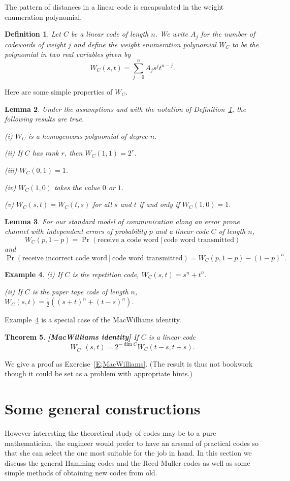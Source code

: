\documentclass[12pt,a4paper]{article}
\theoremstyle{plain}
\newtheorem{theorem}{Theorem}[section]
\newtheorem{lemma}[theorem]{Lemma}
\newtheorem{definition}[theorem]{Definition}
\newtheorem{example}[theorem]{Example}
\theoremstyle{definition}
\begin{document}
The pattern of distances in a linear code
is encapsulated in the
weight enumeration polynomial.
\begin{definition}\label{enumeration}
Let $C$ be a linear code of length $n$.
We write $A_{j}$ for the number of codewords
of weight $j$ and define the
\emph{weight enumeration polynomial} $W_{C}$
to be the polynomial in two real variables
given by
\[W_{C}(s,t)=\sum_{j=0}^{n}A_{j}s^{j}t^{n-j}.\]
\end{definition}
Here are some simple properties of $W_{C}$.
\begin{lemma} Under the assumptions and
with the notation of Definition~\ref{enumeration},
the following results are true.

(i) $W_{C}$ is a homogeneous polynomial of degree $n$.

(ii)  If $C$ has rank $r$, then $W_{C}(1,1)=2^{r}$.

(iii) $W_{C}(0,1)=1$.

(iv) $W_{C}(1,0)$ takes the value $0$ or $1$.

(v)  $W_{C}(s,t)=W_{C}(t,s)$ for all $s$ and $t$
if and only if $W_{C}(1,0)=1$.
\end{lemma}
\begin{lemma} For our standard model of communication
along an error prone channel with independent errors
of probability $p$ and a linear code $C$ of length $n$,
\[W_{C}(p,1-p)=\Pr(\text{receive a code word}\ |
\ \text{code word transmitted})\]
and
\[\Pr(\text{receive incorrect code word}\ |
\ \text{code word transmitted})=W_{C}(p,1-p)-(1-p)^{n}.\]
\end{lemma}
\begin{example}\label{Example William}
(i) If $C$ is the repetition code,
$W_{C}(s,t)=s^{n}+t^{n}$.

(ii) If $C$ is the paper tape code of length $n$,
$W_{C}(s,t)=\frac{1}{2}((s+t)^{n}+(t-s)^{n})$.
\end{example}

Example~\ref{Example William} is a special case of the
MacWilliams identity.
\begin{theorem}{\bf [MacWilliams identity]} If $C$ is a linear
code
\[W_{C^{\perp}}(s,t)=2^{-\dim C}W_{C}(t-s,t+s).\]
\end{theorem}
\noindent
We give a proof as Exercise~\ref{E;MacWilliams}.
(The result is thus not bookwork though it
could be set as a problem with appropriate hints.)
\section{Some general constructions} However
interesting the theoretical study of codes may be
to a pure mathematician,
the engineer would prefer to have an arsenal
of practical codes so that she can select
the one most suitable for the job in hand.
In this section we discuss the general Hamming
codes and the Reed-Muller codes as well as some
simple methods of obtaining new codes from
old.
\end{document}
